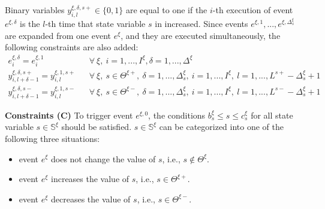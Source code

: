 \documentclass[]{interact}
\theoremstyle{plain}%
\theoremstyle{definition}
\theoremstyle{remark}
\begin{document}
Binary variables $y^{\xi,\delta,s+}_{i,l}\in \{0,1\}$ are equal to one if the $i$-th execution of event $e^{\xi,\delta}$ is the $l$-th time that state variable $s$ in increased. Since events $e^{\xi,1},...,e^{\xi,\Delta^{\xi}_s}$ are expanded from one event $e^{\xi}$, and they are executed simultaneously, the following constraints are also added:
\begin{eqnarray}
e^{\xi,\delta}_i = e^{\xi,1}_i && \forall\ \xi,\ i=1,...,I^{\xi}, \delta=1,...,\Delta^{\xi}\\
y^{\xi,\delta,s+}_{i,l+\delta-1} = y^{\xi,1,s+}_{i,l} &&\forall\ \xi,\ s\in\Theta^{\xi+},\ \delta=1,...,\Delta^{\xi}_s,\ i=1,...,I^{\xi}, \ l=1,...,L^{s+}-\Delta^{\xi}_s+1\\
y^{\xi,\delta,s-}_{i,l+\delta-1} = y^{\xi,1,s-}_{i,l} &&\forall\ \xi,\ s\in\Theta^{\xi-},\ \delta=1,...,\Delta^{\xi}_s,\ i=1,...,I^{\xi}, \ l=1,...,L^{s-}-\Delta^{\xi}_s+1
\end{eqnarray}


\textbf{Constraints (C)} To trigger event $e^{\xi,0}$, the conditions $b^{\xi}_s\le s\le c^{\xi}_s$ for all state variable $s\in \mathbb{S}^{\xi}$ should be satisfied. $s\in \mathbb{S}^{\xi}$ can be categorized into one of the following three situations:
\begin{itemize}
	\item event $e^{\xi}$ does not change the value of $s$, i.e., $s\notin \Theta^{\xi}$.
	\item event $e^{\xi}$ increases the value of $s$, i.e., $s\in \Theta^{\xi+}$. 
	\item event $e^{\xi}$ decreases the value of $s$, i.e., $s\in \Theta^{\xi-}$. 
\end{itemize}
\end{document}
